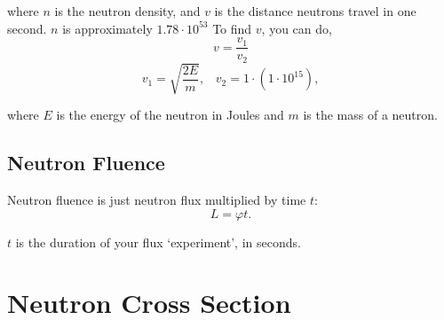 \documentclass{article}
\begin{document}
\begin{multicols*}{2}
    where $n$ is the neutron density, and $v$ is the distance neutrons travel
    in one second. $n$ is approximately $1.78\cdot 10^{53}$ To find $v$, you can do,
      \[
        v = \frac{v_1}{v_2}
      \]\[
        v_1 = \sqrt{\frac{2E}{m}},\;\;\;
        v_2 = 1 \cdot \left(1 \cdot 10^{15}\right),
      \]

      where $E$ is the energy of the neutron in Joules and $m$ is the mass of a neutron.

    \subsection{Neutron Fluence}
    Neutron fluence is just neutron flux multiplied by time $t$:
    \[
      L = \varphi{t}.
    \]

    $t$ is the duration of your flux `experiment', in seconds.

    \section{Neutron Cross Section}
  \end{multicols*}
\end{document}
